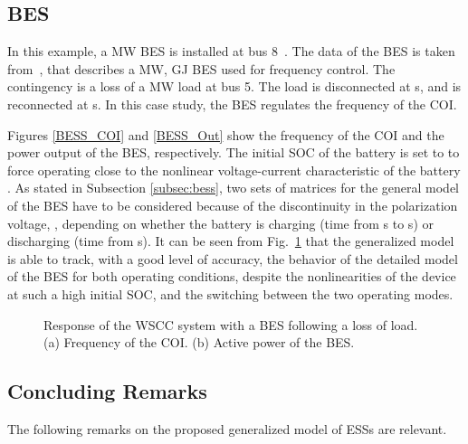 \documentclass[journal, a4paper]{IEEEtran}
\begin{document}
\subsection{BES}
\label{subsec:bessTDS}

In this example, a  MW BES is installed at bus 8~\cite{shepherd:65}.
The data of the BES is taken from~\cite{mercier:09}, 
that describes a  MW,  GJ BES used for frequency control.
The contingency is a loss of a 
MW load at bus 5.  The load is disconnected at  s, and is
reconnected at  s.  In this case study, the BES regulates the
frequency of the COI.

Figures \ref{BESS_COI} and \ref{BESS_Out} show the frequency of the
COI and the power output of the BES, respectively. The initial
  SOC of the battery is set to  to force operating close to the
  nonlinear voltage-current characteristic of the battery
  \cite{tremblay:07, shepherd:65}.  
As stated in Subsection
\ref{subsec:bess}, two sets of matrices for the general model 
of the BES have to be considered
because of the discontinuity in the polarization voltage, ,
depending on whether the battery is charging (time from  s to  s)
or discharging (time from  s). It can be seen from Fig.~\ref{BESScasestudy}
that the generalized model is able to track, with a good level of accuracy, 
the behavior of the detailed model of the BES for both operating conditions, despite
the nonlinearities of the device at such a high initial SOC, and the switching
between the two operating modes.

\begin{figure}[t!]
  \centering
  \vspace{-0.4cm}
  \caption{Response of the WSCC system with a BES following a loss of
    load. (a) Frequency of the COI. (b) Active power of the
    BES.} \label{BESScasestudy}
\end{figure}


\subsection{Concluding Remarks}
\label{sec:remarks}

The following remarks on the proposed generalized model of ESSs are
relevant.
\end{document}
